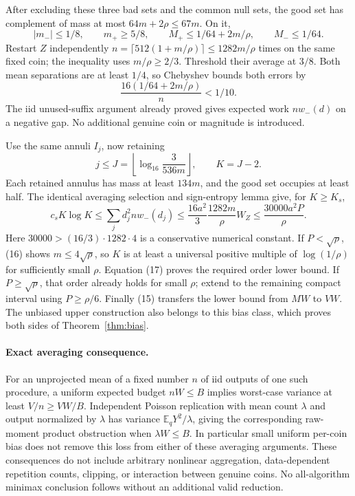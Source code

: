 \documentclass[11pt]{article}
\newcommand{\E}{\mathbb E}
\begin{document}
After excluding these three bad sets and the common null sets, the good set
has complement of mass at most $64m+2\rho\le67m$. On it,
\[
 |m_-|\le1/8,\qquad m_+\ge5/8,\qquad
 M_+\le1/64+2m/\rho,\qquad M_-\le1/64.
\]
Restart $Z$ independently
$n=\lceil512(1+m/\rho)\rceil\le1282m/\rho$ times on the same fixed coin;
the inequality uses $m/\rho\ge2/3$. Threshold their average at $3/8$.
Both mean separations are at least $1/4$, so Chebyshev bounds both errors by
\[
 \frac{16(1/64+2m/\rho)}{n}<1/10.
\]
The iid unused-suffix argument already proved gives expected work $nw_-(d)$
on a negative gap. No additional genuine coin or magnitude is introduced.

Use the same annuli $I_j$, now retaining
\[
 j\le J=\left\lfloor\log_{16}\frac3{536m}\right\rfloor,
 \qquad K=J-2.
\]
Each retained annulus has mass at least $134m$, and the good set occupies at
least half. The identical averaging selection and sign-entropy lemma give,
for $K\ge K_s$,
\[
 c_sK\log K
 \le\sum_jd_j^2nw_-(d_j)
 \le\frac{16a^2}{3}\frac{1282m}{\rho}W_Z
 \le\frac{30000a^2P}{\rho}.                             \tag{17}
\]
Here $30000>(16/3)\cdot1282\cdot4$ is a conservative numerical constant.
If $P<\sqrt\rho$, (16) shows $m\le4\sqrt\rho$, so $K$ is at least a
universal positive multiple of $\log(1/\rho)$ for sufficiently small $\rho$.
Equation (17) proves the required order lower bound. If $P\ge\sqrt\rho$,
that order already holds for small $\rho$; extend to the remaining compact
interval using $P\ge\rho/6$. Finally (15) transfers the lower bound from
$MW$ to $VW$. The unbiased upper construction also belongs to this bias class,
which proves both sides of Theorem~\ref{thm:bias}.

\paragraph{Exact averaging consequence.}
For an unprojected mean of a fixed number $n$ of iid outputs of one such
procedure, a uniform expected budget $nW\le B$ implies worst-case variance
at least $V/n\ge VW/B$. Independent Poisson replication with mean count
$\lambda$ and output normalized by $\lambda$ has variance
$\E_qY^2/\lambda$, giving the corresponding raw-moment product obstruction
when $\lambda W\le B$. In particular small uniform per-coin bias does not
remove this loss from either of these averaging arguments.
These consequences do not include arbitrary nonlinear aggregation,
data-dependent repetition counts, clipping, or interaction between genuine
coins. No all-algorithm minimax conclusion follows without an additional
valid reduction.
\end{document}
